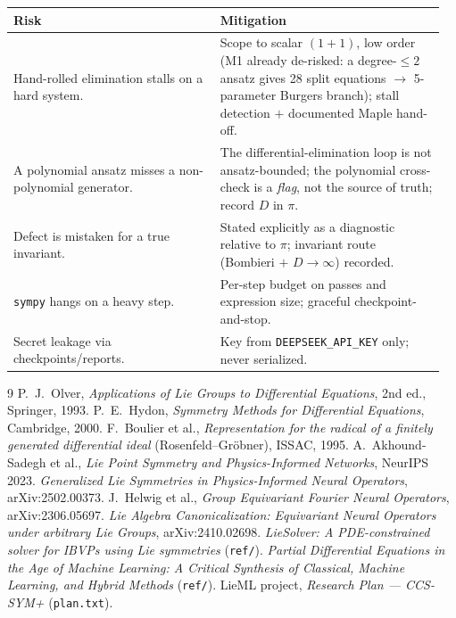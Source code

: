 \documentclass[11pt]{article}
\theoremstyle{definition}
\theoremstyle{remark}
\begin{document}
\begin{center}
\renewcommand{\arraystretch}{1.25}
\begin{tabular}{@{}p{0.46\linewidth} p{0.5\linewidth}@{}}
\hline
\textbf{Risk} & \textbf{Mitigation} \\ \hline
Hand-rolled elimination stalls on a hard system. & Scope to scalar $(1{+}1)$, low order (M1 already de-risked: a degree-$\le 2$ ansatz gives 28 split equations $\to$ 5-parameter Burgers branch); stall detection $+$ documented Maple hand-off. \\
A polynomial ansatz misses a non-polynomial generator. & The differential-elimination loop is not ansatz-bounded; the polynomial cross-check is a \emph{flag}, not the source of truth; record $D$ in $\pi$. \\
Defect is mistaken for a true invariant. & Stated explicitly as a diagnostic relative to $\pi$; invariant route (Bombieri $+$ $D\to\infty$) recorded. \\
\texttt{sympy} hangs on a heavy step. & Per-step budget on passes and expression size; graceful checkpoint-and-stop. \\
Secret leakage via checkpoints/reports. & Key from \texttt{DEEPSEEK\_API\_KEY} only; never serialized. \\ \hline
\end{tabular}
\end{center}

\begin{thebibliography}{9}
 P.~J.~Olver, \emph{Applications of Lie Groups to Differential Equations}, 2nd ed., Springer, 1993.
 P.~E.~Hydon, \emph{Symmetry Methods for Differential Equations}, Cambridge, 2000.
 F.~Boulier et al., \emph{Representation for the radical of a finitely generated differential ideal} (Rosenfeld--Gr\"obner), ISSAC, 1995.
 A.~Akhound-Sadegh et al., \emph{Lie Point Symmetry and Physics-Informed Networks}, NeurIPS 2023.
 \emph{Generalized Lie Symmetries in Physics-Informed Neural Operators}, arXiv:2502.00373.
 J.~Helwig et al., \emph{Group Equivariant Fourier Neural Operators}, arXiv:2306.05697.
 \emph{Lie Algebra Canonicalization: Equivariant Neural Operators under arbitrary Lie Groups}, arXiv:2410.02698.
 \emph{LieSolver: A PDE-constrained solver for IBVPs using Lie symmetries} (\texttt{ref/}).
 \emph{Partial Differential Equations in the Age of Machine Learning: A Critical Synthesis of Classical, Machine Learning, and Hybrid Methods} (\texttt{ref/}).
 LieML project, \emph{Research Plan --- CCS-SYM+} (\texttt{plan.txt}).
\end{thebibliography}
\end{document}
